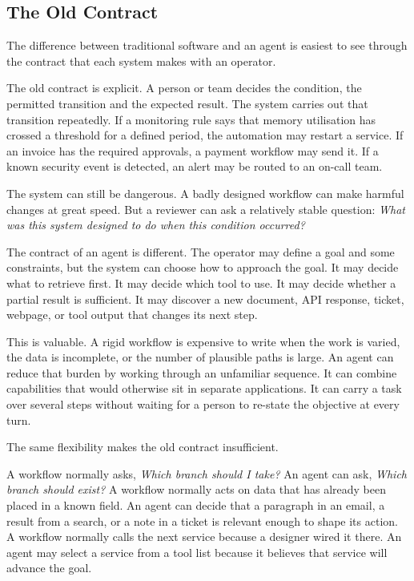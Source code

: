 \subsection{The Old Contract}\label{the-old-contract}

The difference between traditional software and an agent is easiest to
see through the contract that each system makes with an operator.

The old contract is explicit. A person or team decides the condition,
the permitted transition and the expected result. The system carries out
that transition repeatedly. If a monitoring rule says that memory
utilisation has crossed a threshold for a defined period, the automation
may restart a service. If an invoice has the required approvals, a
payment workflow may send it. If a known security event is detected, an
alert may be routed to an on-call team.

The system can still be dangerous. A badly designed workflow can make
harmful changes at great speed. But a reviewer can ask a relatively
stable question: \emph{What was this system designed to do when this
condition occurred?}

The contract of an agent is different. The operator may define a goal
and some constraints, but the system can choose how to approach the
goal. It may decide what to retrieve first. It may decide which tool to
use. It may decide whether a partial result is sufficient. It may
discover a new document, API response, ticket, webpage, or tool output
that changes its next step.

This is valuable. A rigid workflow is expensive to write when the work
is varied, the data is incomplete, or the number of plausible paths is
large. An agent can reduce that burden by working through an unfamiliar
sequence. It can combine capabilities that would otherwise sit in
separate applications. It can carry a task over several steps without
waiting for a person to re-state the objective at every turn.

The same flexibility makes the old contract insufficient.

A workflow normally asks, \emph{Which branch should I take?} An agent
can ask, \emph{Which branch should exist?} A workflow normally acts on
data that has already been placed in a known field. An agent can decide
that a paragraph in an email, a result from a search, or a note in a
ticket is relevant enough to shape its action. A workflow normally calls
the next service because a designer wired it there. An agent may select
a service from a tool list because it believes that service will advance
the goal.

